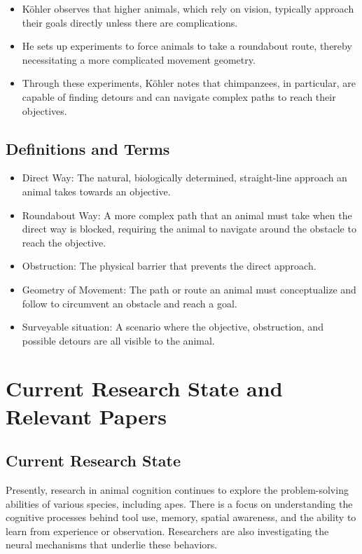 \documentclass{article}
\begin{document}
\begin{itemize}
    \item Köhler observes that higher animals, which rely on vision, typically approach their goals directly unless there are complications.
    \item He sets up experiments to force animals to take a roundabout route, thereby necessitating a more complicated movement geometry.
    \item Through these experiments, Köhler notes that chimpanzees, in particular, are capable of finding detours and can navigate complex paths to reach their objectives.
\end{itemize}

\subsection{Definitions and Terms}

\begin{itemize}
    \item Direct Way: The natural, biologically determined, straight-line approach an animal takes towards an objective.
    \item Roundabout Way: A more complex path that an animal must take when the direct way is blocked, requiring the animal to navigate around the obstacle to reach the objective.
    \item Obstruction: The physical barrier that prevents the direct approach.
    \item Geometry of Movement: The path or route an animal must conceptualize and follow to circumvent an obstacle and reach a goal.
    \item Surveyable situation: A scenario where the objective, obstruction, and possible detours are all visible to the animal.
\end{itemize}

\section{Current Research State and Relevant Papers}

\subsection{Current Research State}

Presently, research in animal cognition continues to explore the problem-solving abilities of various species, including apes. There is a focus on understanding the cognitive processes behind tool use, memory, spatial awareness, and the ability to learn from experience or observation. Researchers are also investigating the neural mechanisms that underlie these behaviors.
\end{document}
